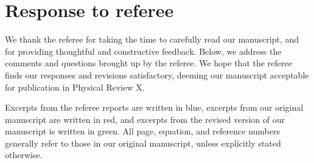 \documentclass[reprint,onecolumn,12pt]{revtex4-2}
\newcommand{\blue}[1]{{\color{blue} #1}}
\newcommand{\red}[1]{{\color{red} #1}}
\newcommand{\green}[1]{{\color{ForestGreen} #1}}
\begin{document}
\section*{Response to referee}

We thank the referee for taking the time to carefully read our
manuscript, and for providing thoughtful and constructive feedback.
Below, we address the comments and questions brought up by the
referee.  We hope that the referee finds our responses and revisions
satisfactory, deeming our manuscript acceptable for publication in
Physical Review X.

Excerpts from the referee reports are written in \blue{blue}, excerpts
from our original manuscript are written in \red{red}, and excerpts
from the revised version of our manuscript is written in
\green{green}.  All page, equation, and reference numbers generally
refer to those in our original manuscript, unless explicitly stated
otherwise.
\end{document}
